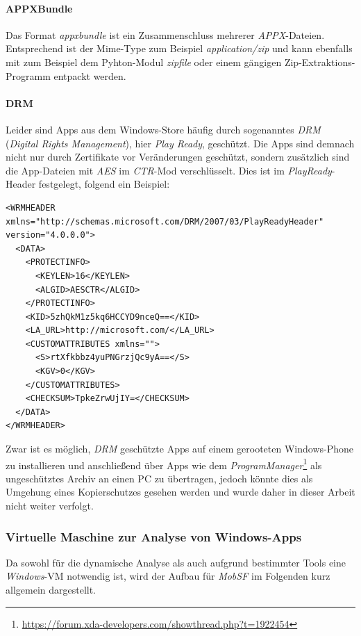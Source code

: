 \paragraph{APPXBundle}
Das Format \textit{appxbundle} ist ein Zusammenschluss mehrerer \textit{APPX}-Dateien. Entsprechend ist der Mime-Type zum Beispiel \textit{application/zip} und kann ebenfalls mit zum Beispiel dem Pyhton-Modul \textit{zipfile} oder einem gängigen Zip-Extraktions-Programm entpackt werden.

\paragraph{DRM}
Leider sind Apps aus dem Windows-Store häufig durch sogenanntes \textit{DRM} (\textit{Digital Rights Management}), hier \textit{Play Ready}, geschützt. Die Apps sind demnach nicht nur durch Zertifikate vor Veränderungen geschützt, sondern zusätzlich sind die App-Dateien mit \textit{AES} im \textit{CTR}-Mod verschlüsselt. Dies ist im \textit{PlayReady}-Header festgelegt, folgend ein Beispiel:
\begin{lstlisting}
<WRMHEADER xmlns="http://schemas.microsoft.com/DRM/2007/03/PlayReadyHeader" version="4.0.0.0">
  <DATA>
    <PROTECTINFO>
      <KEYLEN>16</KEYLEN>
      <ALGID>AESCTR</ALGID>
    </PROTECTINFO>
    <KID>5zhQkM1z5kq6HCCYD9nceQ==</KID>
    <LA_URL>http://microsoft.com/</LA_URL>
    <CUSTOMATTRIBUTES xmlns="">
      <S>rtXfkbbz4yuPNGrzjQc9yA==</S>
      <KGV>0</KGV>
    </CUSTOMATTRIBUTES>
    <CHECKSUM>TpkeZrwUjIY=</CHECKSUM>
  </DATA>
</WRMHEADER>
\end{lstlisting}

Zwar ist es möglich, \textit{DRM} geschützte Apps auf einem gerooteten Windows-Phone zu installieren und anschließend über Apps wie dem \textit{ProgramManager}\footnote{\url{https://forum.xda-developers.com/showthread.php?t=1922454}} als ungeschütztes Archiv an einen PC zu übertragen, jedoch könnte dies als Umgehung eines Kopierschutzes gesehen werden und wurde daher in dieser Arbeit nicht weiter verfolgt.

\newpage
\subsubsection{Virtuelle Maschine zur Analyse von Windows-Apps}
Da sowohl für die dynamische Analyse als auch aufgrund bestimmter Tools eine \textit{Windows}-VM notwendig ist, wird der Aufbau für \textit{MobSF} im Folgenden kurz allgemein dargestellt.\\

